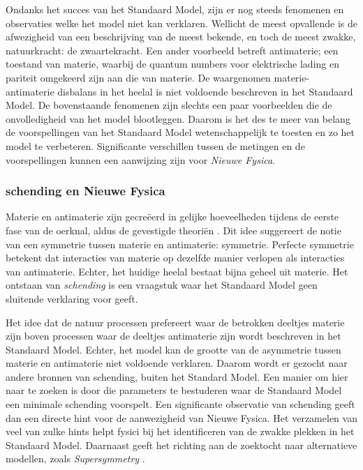 Ondanks het succes van het Standaard Model, zijn er nog steeds fenomenen en observaties welke het model niet kan verklaren.
Wellicht de meest opvallende is de afwezigheid van een beschrijving van de meest bekende, en toch de meest zwakke, natuurkracht:
de zwaartekracht. Een ander voorbeeld betreft antimaterie; een toestand van materie, waarbij de quantum numbers voor elektrische
lading en pariteit omgekeerd zijn aan die van materie. De waargenomen materie-antimaterie disbalans in het
heelal \cite{more-cpv-huet,more-cpv-gavela_I,more-cpv-gavela_II} is niet voldoende beschreven in het Standaard Model.
De bovenstaande fenomenen zijn slechts een paar voorbeelden die de onvolledigheid van het model blootleggen.
Daarom is het des te meer van belang de voorspellingen van het Standaard Model wetenschappelijk te toesten en zo het model te
verbeteren. Significante verschillen tussen de metingen en de voorspellingen kunnen een aanwijzing zijn voor {\it Nieuwe Fysica}.

\subsubsection{\CP schending en Nieuwe Fysica}
Materie en antimaterie zijn gecre\"eerd in gelijke hoeveelheden tijdens de eerste fase van de oerknal, aldus de
gevestigde theori\"en \cite{more-cpv-huet,more-cpv-gavela_I,more-cpv-gavela_II}. Dit idee suggereert de notie van
een symmetrie tussen materie en antimaterie: \CP symmetrie. Perfecte \CP symmetrie betekent dat interacties van
materie op dezelfde manier verlopen als interacties van antimaterie. Echter, het huidige heelal bestaat bijna
geheel uit materie. Het ontstaan van  {\it \CP schending} is een vraagstuk waar het Standaard Model geen
sluitende verklaring voor geeft.

Het idee dat de natuur processen prefereert waar de betrokken deeltjes materie zijn boven processen waar de
deeltjes antimaterie zijn wordt beschreven in het Standaard Model. Echter, het model kan de grootte van de
asymmetrie tussen materie en antimaterie niet voldoende verklaren. Daarom wordt er gezocht naar andere bronnen
van \CP schending, buiten het Standard Model. Een manier om hier naar te zoeken is door  die parameters te
bestuderen waar de Standaard Model een minimale \CP schending voorspelt. Een significante observatie van \CP
schending geeft dan een directe hint voor de aanwezigheid van Nieuwe Fysica. Het verzamelen van veel van zulke
hints helpt fysici bij het identificeren van de zwakke plekken in het Standaard Model. Daarnaast geeft het
richting aan de zoektocht naar alternatieve modellen, zoals {\it Supersymmetry}  \eg \cite{Golfand:1971iw,Volkov:1973ix,Wess:1974tw}.

